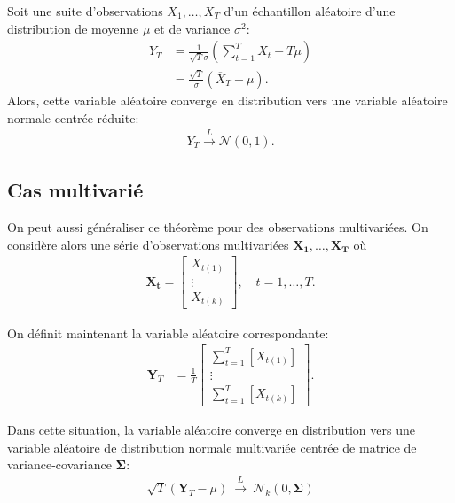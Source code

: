 Soit une suite d'observations $X_1, \ldots, X_T$ d'un échantillon
aléatoire d'une distribution de moyenne $\mu$ et de variance
$\sigma^2$:
\begin{align}
  \label{eq:TCL}
  Y_T &= \frac{1}{\sqrt{T}\sigma} \left(\sum_{t=1}^T X_t - T\mu\right) \nonumber\\
  &= \frac{\sqrt{T}}{\sigma}\left(\overline{X}_T-\mu\right).
\end{align}
Alors, cette variable aléatoire converge en distribution vers une
variable aléatoire normale centrée réduite:
\begin{align}
  \label{eq:TCL2}
  Y_T \stackrel{L}{\rightarrow} \mathcal{N}(0,1).
\end{align}

\subsection{Cas multivarié}
\label{sec:cas-multivarie}

On peut aussi généraliser ce théorème pour des observations
multivariées. On considère alors une série d'observations
multivariées $\mathbf{X_1}, \ldots, \mathbf{X_T}$ où
\begin{align}
  \label{eq:defmultiX}
  \mathbf{X_t}=\begin{bmatrix} X_{t(1)} \\ \vdots \\
    X_{t(k)} \end{bmatrix}, \quad t=1,\ldots,T.
\end{align}

On définit maintenant la variable aléatoire correspondante:
\begin{align}
  \label{eq:TCLmulti1}
  \mathbf{Y}_T &= \frac{1}{T}\begin{bmatrix} \sum_{t=1}^{T} \left [
      X_{t(1)} \right ] \\ \vdots \\ \sum_{t=1}^{T} \left [ X_{t(k)}
    \right ] \end{bmatrix}.
\end{align}

Dans cette situation, la variable aléatoire converge en distribution
vers une variable aléatoire de distribution normale multivariée
centrée de matrice de variance-covariance $\mathbf{\Sigma}$:
\begin{align}
  \label{eq:TCLmulti2}
  \sqrt{T}\left(\mathbf{Y}_T - \mu\right)\ \stackrel{L}{\rightarrow}\
  \mathcal{N}_k(0,\mathbf{\Sigma})
\end{align}

